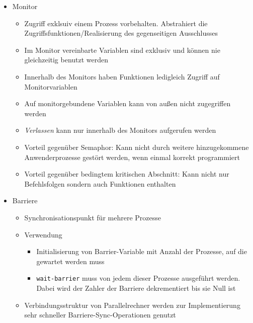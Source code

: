 \begin{itemize}
\begin{itemize}
\begin{itemize}
			\item Monitor
			\begin{itemize}
				\item Zugriff exklsuiv einem Prozess vorbehalten. Abstrahiert die Zugriffsfunktionen/Realisierung des gegenseitigen Ausschlusses
				\item Im Monitor vereinbarte Variablen sind exklusiv und können nie gleichzeitig benutzt werden
				\item Innerhalb des Monitors haben Funktionen ledigleich Zugriff auf Monitorvariablen
				\item Auf monitorgebundene Variablen kann von außen nicht zugegriffen werden
				\item \textit{Verlassen} kann nur innerhalb des Monitors aufgerufen werden
				\item Vorteil gegenüber Semaphor: Kann nicht durch weitere hinzugekommene Anwenderprozesse gestört werden, wenn einmal korrekt programmiert
				\item Vorteil gegenüber bedingtem kritischen Abschnitt: Kann nicht nur Befehlsfolgen sondern auch Funktionen enthalten
			\end{itemize}
			\item Barriere
			\begin{itemize}
				\item Synchronisationspunkt für mehrere Prozesse
				\item Verwendung
				\begin{itemize}
					\item Initialisierung von Barrier-Variable mit Anzahl der Prozesse, auf die gewartet werden muss
					\item \texttt{wait-barrier} muss von jedem dieser Prozesse ausgeführt werden. Dabei wird der Zahler der Barriere dekrementiert bis sie Null ist
				\end{itemize}
				\item Verbindungsstruktur von Parallelrechner werden zur Implementierung sehr schneller Barriere-Sync-Operationen genutzt
			\end{itemize}
		\end{itemize}
	\end{itemize}
\end{itemize}


